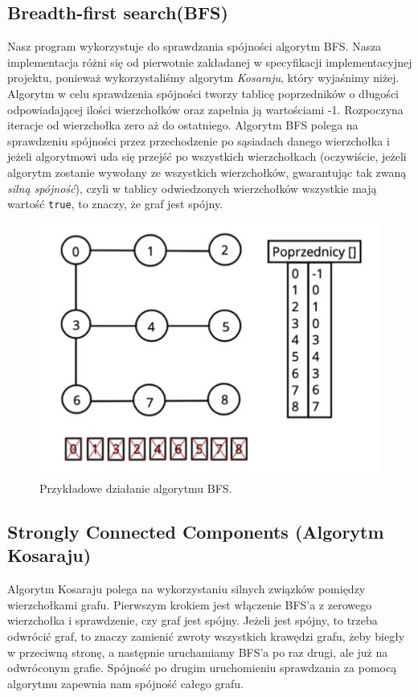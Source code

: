 \documentclass[10pt, a4paper]{report}
\begin{document}
\subsection{Breadth-first search(BFS)}\label{subsec:breadth-first-search(bfs)}
Nasz program wykorzystuje do sprawdzania spójności algorytm BFS. Nasza
implementacja różni się od pierwotnie zakładanej w specyfikacji
implementacyjnej
projektu, ponieważ wykorzystaliśmy algorytm \textit{Kosaraju}, który wyjaśnimy
niżej.
Algorytm w celu sprawdzenia spójności tworzy tablicę poprzedników o długości
odpowiadającej ilości wierzchołków
oraz zapełnia ją wartościami -1. Rozpoczyna iteracje od wierzchołka zero aż
do ostatniego.
Algorytm BFS polega na sprawdzeniu spójności przez przechodzenie po sąsiadach
danego wierzchołka i jeżeli algorytmowi uda się
przejść po wszystkich wierzchołkach (oczywiście, jeżeli algorytm zostanie
wywołany ze wszystkich wierzchołków, gwarantując tak zwaną \textit{silną
  spójność}), czyli w tablicy odwiedzonych wierzchołków wszystkie mają wartość
\texttt{true}, to znaczy, że graf jest spójny.
\begin{figure}[h]
  \begin{center}
    \includegraphics[scale=0.5]{bfs.png}
    \caption{Przykładowe działanie algorytmu BFS.}
  \end{center}
\end{figure}
\newpage

\subsection{Strongly Connected Components (Algorytm Kosaraju)}\label{subsec:kosaraju}
Algorytm Kosaraju polega na wykorzystaniu silnych związków pomiędzy
wierzchołkami grafu. Pierwszym krokiem jest włączenie BFS'a z zerowego
wierzchołka i sprawdzenie, czy graf jest spójny.
Jeżeli jest spójny, to trzeba odwrócić graf, to znaczy zamienić zwroty
wszystkich krawędzi grafu, żeby biegły w przeciwną stronę, a następnie
uruchamiamy BFS'a po raz drugi, ale już na odwróconym grafie.
Spójność po drugim uruchomieniu sprawdzania za pomocą algorytmu zapewnia nam
spójność całego grafu.
\end{document}
